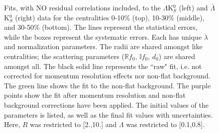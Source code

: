 \documentclass[../AnalysisNoteJBuxton.tex]{subfiles}
\renewcommand{\ResNum}{_NoRes}
\renewcommand{\SaveNameModLamKs}{\MomRes\NonFlatBgd\ResNum\ParamFixAndShareLamKs}
\begin{document}
\pagestyle{empty}
\begin{landscape}

\begin{figure}[h]
  \centering
  \caption[$\Lambda$K$^{0}_{S}$($\bar{\Lambda}$K$^{0}_{S}$) Fits with No Residuals]{Fits, with NO residual correlations included, to the $\Lambda$K$^{0}_{S}$ (left) and $\bar{\Lambda}$K$^{0}_{S}$ (right) data for the centralities 0-10\% (top), 10-30\% (middle), and 30-50\% (bottom).
The lines represent the statistical errors, while the boxes represent the systematic errors.
Each has unique $\lambda$ and normalization parameters.
The radii are shared amongst like centralities; the scattering parameters ($\mathbb{R}f_{0}$, $\mathbb{I}f_{0}$, $d_{0}$) are shared amongst all.
The black solid line represents the ``raw" fit, i.e. not corrected for momentum resolution effects nor non-flat background.  
The green line shows the fit to the non-flat background.
The purple points show the fit after momentum resolution and non-flat background corrections have been applied.
The initial values of the parameters is listed, as well as the final fit values with uncertainties.
Here, $R$ was restricted to [2.,10.] and $\Lambda$ was restricted to [0.1,0.8].}
  \label{fig:LamK0wConjFits_NoRes}
\end{figure}




\end{landscape}
\end{document}

